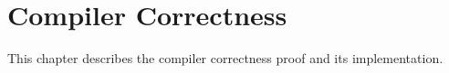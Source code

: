\chapter{Compiler Correctness \label{ch:compiler}}

This chapter describes the compiler correctness proof and its implementation.



